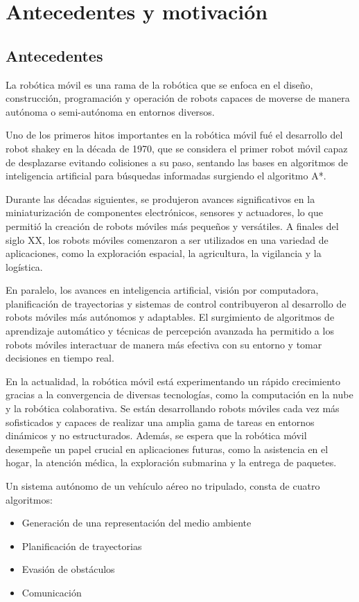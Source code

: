 \section{Antecedentes y motivación} 

\subsection*{Antecedentes}

La robótica móvil es una rama de la robótica que se enfoca en el diseño, construcción, programación y operación de robots capaces de moverse de manera autónoma o semi-autónoma en entornos diversos.

Uno de los primeros hitos importantes en la robótica móvil fué el desarrollo del robot shakey en la década de 1970, que se considera el primer robot móvil capaz de desplazarse evitando colisiones a su paso, sentando las bases en algoritmos de inteligencia artificial para búsquedas informadas surgiendo el algoritmo A*. 

Durante las décadas siguientes, se produjeron avances significativos en la miniaturización de componentes electrónicos, sensores y actuadores, lo que permitió la creación de robots móviles más pequeños y versátiles. A finales del siglo XX, los robots móviles comenzaron a ser utilizados en una variedad de aplicaciones, como la exploración espacial, la agricultura, la vigilancia y la logística.

En paralelo, los avances en inteligencia artificial, visión por computadora, planificación de trayectorias y sistemas de control contribuyeron al desarrollo de robots móviles más autónomos y adaptables. El surgimiento de algoritmos de aprendizaje automático y técnicas de percepción avanzada ha permitido a los robots móviles interactuar de manera más efectiva con su entorno y tomar decisiones en tiempo real.

En la actualidad, la robótica móvil está experimentando un rápido crecimiento gracias a la convergencia de diversas tecnologías, como la computación en la nube y la robótica colaborativa. Se están desarrollando robots móviles cada vez más sofisticados y capaces de realizar una amplia gama de tareas en entornos dinámicos y no estructurados. Además, se espera que la robótica móvil desempeñe un papel crucial en aplicaciones futuras, como la asistencia en el hogar, la atención médica, la exploración submarina y la entrega de paquetes.

Un sistema autónomo de un vehículo aéreo no tripulado, consta de cuatro algoritmos:
\begin{itemize}\setlength{\itemsep}{-1mm}
\item Generación de una representación del medio ambiente
\item Planificación de trayectorias
\item Evasión de obstáculos
\item Comunicación
\end{itemize}

